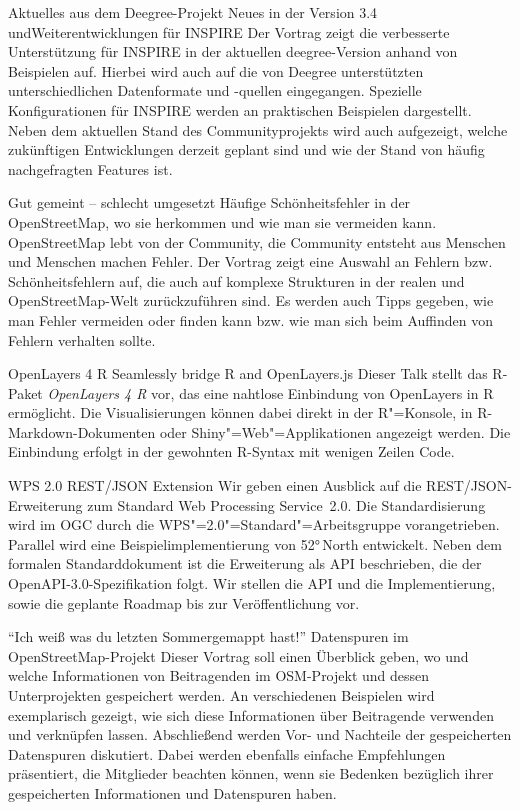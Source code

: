 %
{Aktuelles aus dem Deegree-Projekt}%
{Neues in der Version 3.4 und\linebreak Weiterentwicklungen für INSPIRE}%
{%
Der Vortrag zeigt die verbesserte Unterstützung für INSPIRE in der aktuellen
deegree-Version anhand von Beispielen auf. Hierbei wird auch auf die von
Deegree unterstützten unterschiedlichen Datenformate und -quellen eingegangen.
Spezielle Konfigurationen für INSPIRE werden an praktischen Beispielen
dargestellt. Neben dem aktuellen Stand des Communityprojekts wird auch
aufgezeigt, welche zukünftigen Entwicklungen derzeit geplant sind und wie der
Stand von häufig nachgefragten Features ist.%
}



%
{Gut gemeint -- schlecht umgesetzt}%
{Häufige Schönheitsfehler in der OpenStreetMap, wo sie herkommen und wie man sie vermeiden kann.}%
{%
OpenStreetMap lebt von der Community, die Community entsteht aus Menschen und
Menschen machen Fehler. Der Vortrag zeigt eine Auswahl an Fehlern bzw.
Schönheitsfehlern auf, die auch auf komplexe Strukturen in der realen und
OpenStreetMap-Welt zurückzuführen sind. Es werden auch Tipps gegeben, wie man Fehler
vermeiden oder finden kann bzw. wie man sich beim Auffinden von Fehlern
verhalten sollte.%
}

%
{OpenLayers 4 R}%
{Seamlessly bridge R and OpenLayers.js}%
{%
Dieser Talk stellt das R-Paket \emph{OpenLayers 4 R} vor, das eine nahtlose
Einbindung von OpenLayers in R ermöglicht. Die Visualisierungen können dabei
direkt in der R"=Konsole, in R-Markdown-Dokumenten oder
Shiny"=Web"=Applikationen angezeigt werden. Die Einbindung erfolgt in der
gewohnten R-Syntax mit wenigen Zeilen Code.%
}

%
{WPS 2.0 REST/JSON Extension}%
{}%
{%
Wir geben einen Ausblick auf die REST/JSON-Erweiterung zum Standard Web
Processing Service~2.0. Die Standardisierung wird im OGC durch die
WPS"=2.0"=Standard"=Arbeitsgruppe vorangetrieben. Parallel wird eine
Beispielimplementierung von 52°\,North entwickelt. Neben dem formalen
Standarddokument ist die Erweiterung als API beschrieben, die der
OpenAPI-3.0-Spezifikation folgt. Wir stellen die API und die Implementierung,
sowie die geplante Roadmap bis zur Veröffentlichung vor.%
}

%
{"`Ich weiß was du letzten Sommer\linebreak gemappt hast!"'}%
{Datenspuren im OpenStreetMap-Projekt}%
{%
Dieser Vortrag soll einen Überblick geben, wo und welche Informationen von
Beitragenden im OSM-Projekt und dessen Unterprojekten gespeichert werden. An
verschiedenen Beispielen wird exemplarisch gezeigt, wie sich diese
Informationen über Beitragende verwenden und verknüpfen lassen. Abschließend
werden Vor- und Nachteile der gespeicherten Datenspuren diskutiert. Dabei
werden ebenfalls einfache Empfehlungen präsentiert, die Mitglieder beachten
können, wenn sie Bedenken bezüglich ihrer gespeicherten Informationen und
Datenspuren haben.%
}

